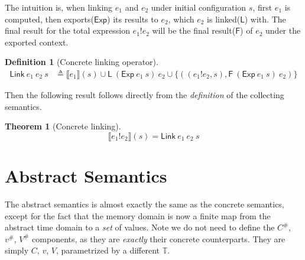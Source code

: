 \documentclass[acmsmall,screen,review]{acmart}
\theoremstyle{definition}
\newtheorem{definition}{Definition}[section]
\newtheorem{thm}{Theorem}[section]
\newcommand*{\A}[1]{{#1}^{\#}}
\newcommand*{\Time}{\mathbb{T}}
\newcommand*{\link}[2]{{#1}\mathtt{!}{#2}}
\newcommand*{\EE}{\mathsf{Exp}}
\newcommand*{\LL}{\mathsf{L}}
\newcommand*{\Link}{\mathsf{Link}}
\newcommand*{\sembracket}[1]{\lBrack{#1}\rBrack}
\begin{document}
The intuition is, when linking $e_1$ and $e_2$ under initial configuration $s$, first $e_1$ is computed, then exports($\EE$) its results to $e_2$, which $e_2$ is linked($\LL$) with.
The final result for the total expression $\link{e_1}{e_2}$ will be the final result($\mathsf{F}$) of $e_2$ under the exported context.

\begin{definition}[Concrete linking operator]
  \begin{align*}
    \Link\:e_1\:e_2\:s & \triangleq\sembracket{e_1}(s)\cup\LL\:(\EE\:e_1\:s)\:e_2\cup\{((\link{e_1}{e_2},s),\mathsf{F}\:(\EE\:e_1\:s)\:e_2)\}
  \end{align*}
\end{definition}

Then the following result follows directly from the \emph{definition} of the collecting semantics.

\begin{thm}[Concrete linking]
  \[
    \sembracket{\link{e_1}{e_2}}(s)=\Link\:e_1\:e_2\:s
  \]
\end{thm}

\section{Abstract Semantics}

The abstract semantics is almost exactly the same as the concrete semantics, except for the fact that the memory domain is now a finite map from the abstract time domain to a \emph{set} of values.
Note we do not need to define the $\A{C}$, $\A{v}$, $\A{V}$ components, as they are \emph{exactly} their concrete counterparts.
They are simply $C$, $v$, $V$, parametrized by a different $\Time$.
\end{document}
